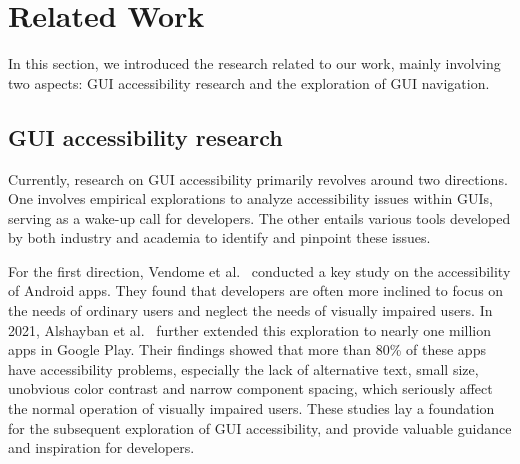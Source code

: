 \section{Related Work}
\label{sec: related work}

In this section, we introduced the research related to our work, mainly involving two aspects: GUI accessibility research and the exploration of GUI navigation.

\subsection{GUI accessibility research}

Currently, research on GUI accessibility primarily revolves around two directions. 
One involves empirical explorations to analyze accessibility issues within GUIs, serving as a wake-up call for developers. 
The other entails various tools developed by both industry and academia to identify and pinpoint these issues.

For the first direction, Vendome et al.~\cite{Vendome2019CanEU} conducted a key study on the accessibility of Android apps. 
They found that developers are often more inclined to focus on the needs of ordinary users and neglect the needs of visually impaired users.
In 2021, Alshayban et al.~\cite{Alshayban2020AccessibilityII} further extended this exploration to nearly one million apps in Google Play.
Their findings showed that more than 80\% of these apps have accessibility problems, especially the lack of alternative text, small size, unobvious color contrast and narrow component spacing, which seriously affect the normal operation of visually impaired users.
These studies lay a foundation for the subsequent exploration of GUI accessibility, and provide valuable guidance and inspiration for developers.

